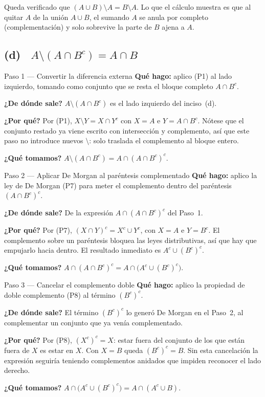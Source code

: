\documentclass[11pt]{article}
\begin{document}
\begin{resp}
Queda verificado que $(A\cup B)\setminus A=B\setminus A$. Lo que el cálculo muestra es que al
quitar $A$ de la unión $A\cup B$, el sumando $A$ se anula por completo (complementación) y solo
sobrevive la parte de $B$ ajena a $A$.
\end{resp}

\subsection*{(d) \ $A\setminus(A\cap B^{c})=A\cap B$}

\begin{paso}{Paso 1 --- Convertir la diferencia externa}
\textbf{Qué hago:} aplico (P1) al lado izquierdo, tomando como conjunto que se resta el bloque
completo $A\cap B^{c}$.

\textbf{¿De dónde sale?} $A\setminus(A\cap B^{c})$ es el lado izquierdo del inciso~(d).

\textbf{¿Por qué?} Por (P1), $X\setminus Y=X\cap Y^{c}$ con $X=A$ e $Y=A\cap B^{c}$. Nótese que
el conjunto restado ya viene escrito con intersección y complemento, así que este paso no
introduce nuevos $\setminus$: solo traslada el complemento al bloque entero.

\textbf{¿Qué tomamos?} $A\setminus(A\cap B^{c})=A\cap(A\cap B^{c})^{c}$.
\end{paso}

\begin{paso}{Paso 2 --- Aplicar De Morgan al paréntesis complementado}
\textbf{Qué hago:} aplico la ley de De Morgan (P7) para meter el complemento dentro del
paréntesis $(A\cap B^{c})^{c}$.

\textbf{¿De dónde sale?} De la expresión $A\cap(A\cap B^{c})^{c}$ del Paso~1.

\textbf{¿Por qué?} Por (P7), $(X\cap Y)^{c}=X^{c}\cup Y^{c}$, con $X=A$ e $Y=B^{c}$. El
complemento sobre un paréntesis bloquea las leyes distributivas, así que hay que empujarlo hacia
dentro. El resultado inmediato es $A^{c}\cup(B^{c})^{c}$.

\textbf{¿Qué tomamos?} $A\cap(A\cap B^{c})^{c}=A\cap\bigl(A^{c}\cup(B^{c})^{c}\bigr)$.
\end{paso}

\begin{paso}{Paso 3 --- Cancelar el complemento doble}
\textbf{Qué hago:} aplico la propiedad de doble complemento (P8) al término $(B^{c})^{c}$.

\textbf{¿De dónde sale?} El término $(B^{c})^{c}$ lo generó De Morgan en el Paso~2, al
complementar un conjunto que ya venía complementado.

\textbf{¿Por qué?} Por (P8), $(X^{c})^{c}=X$: estar fuera del conjunto de los que están fuera de
$X$ es estar en $X$. Con $X=B$ queda $(B^{c})^{c}=B$. Sin esta cancelación la expresión seguiría
teniendo complementos anidados que impiden reconocer el lado derecho.

\textbf{¿Qué tomamos?} $A\cap\bigl(A^{c}\cup(B^{c})^{c}\bigr)=A\cap(A^{c}\cup B)$.
\end{paso}
\end{document}
